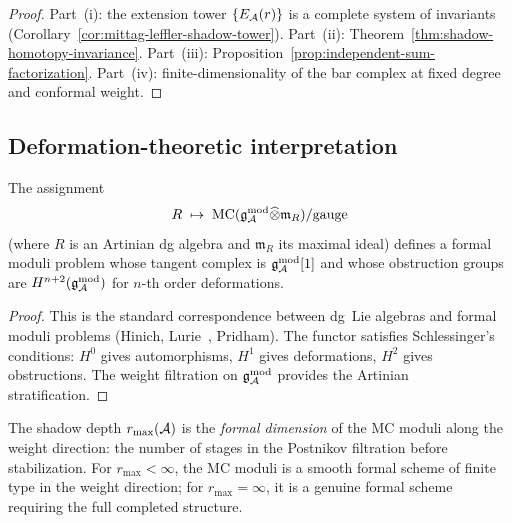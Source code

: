 \begin{proof}
Part~(i): the extension tower
$\{E_{\mathcal{A}}(r)\}$ is a complete system of invariants
(Corollary~\ref{cor:mittag-leffler-shadow-tower}).
Part~(ii):
Theorem~\ref{thm:shadow-homotopy-invariance}.
Part~(iii):
Proposition~\ref{prop:independent-sum-factorization}.
Part~(iv): finite-dimensionality of the bar complex at
fixed degree and conformal weight.
\end{proof}


\subsection{Deformation-theoretic interpretation}
\label{subsec:deformation-interpretation}

\begin{proposition}
\label{prop:mc-formal-moduli}
The assignment
\begin{equation}\label{eq:mc-formal-moduli}
R \;\mapsto\; \mathrm{MC}(\mathfrak{g}_{\mathcal{A}}^{\mathrm{mod}} \widehat{\otimes} \mathfrak{m}_R)
/ \mathrm{gauge}
\end{equation}
(where $R$ is an Artinian dg algebra and $\mathfrak{m}_R$
its maximal ideal) defines a formal moduli problem
whose tangent complex is $\mathfrak{g}_{\mathcal{A}}^{\mathrm{mod}}[1]$ and whose
obstruction groups are
$H^{n+2}(\mathfrak{g}_{\mathcal{A}}^{\mathrm{mod}})$ for $n$-th order deformations.
\end{proposition}

\begin{proof}
This is the standard correspondence between dg~Lie
algebras and formal moduli problems
(Hinich, Lurie~\cite{LurieDAGX},
Pridham). The functor satisfies Schlessinger's
conditions: $H^0$ gives automorphisms, $H^1$ gives
deformations, $H^2$ gives obstructions.
The weight filtration on $\mathfrak{g}_{\mathcal{A}}^{\mathrm{mod}}$ provides the
Artinian stratification.
\end{proof}

The shadow depth $r_{\max}(\mathcal{A})$ is the
\emph{formal dimension} of the MC moduli along the
weight direction: the number of stages in the
Postnikov filtration before stabilization. For
$r_{\max} < \infty$, the MC moduli is a smooth
formal scheme of finite type in the weight direction;
for $r_{\max} = \infty$, it is a genuine formal scheme
requiring the full completed structure.


